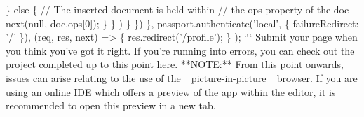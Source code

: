 \documentclass{article}%
\begin{document}
            \} else \{\newline%
              // The inserted document is held within\newline%
              // the ops property of the doc\newline%
              next(null, doc.ops{[}0{]});\newline%
            \}\newline%
          \}\newline%
        )\newline%
      \}\newline%
    \})\newline%
  \},\newline%
    passport.authenticate('local', \{ failureRedirect: '/' \}),\newline%
    (req, res, next) => \{\newline%
      res.redirect('/profile');\newline%
    \}\newline%
  );\newline%
```\newline%
Submit your page when you think you've got it right. If you're running into errors, you can check out the project completed up to this point here.\newline%
**NOTE:** From this point onwards, issues can arise relating to the use of the \_picture{-}in{-}picture\_ browser. If you are using an online IDE which offers a preview of the app within the editor, it is recommended to open this preview in a new tab.\newline%

%
\end{document}
